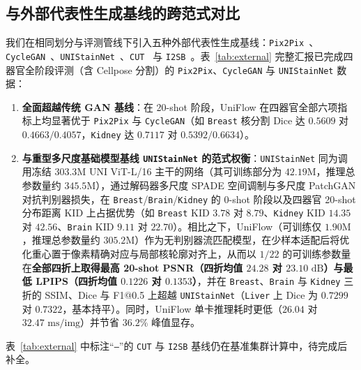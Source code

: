 \documentclass[journal]{IEEEtran}
\newcommand{\methodname}{UniFlow}
\begin{document}
\begin{enumerate}
\end{enumerate}

\subsection{与外部代表性生成基线的跨范式对比}\label{sec:external}
我们在相同划分与评测管线下引入五种外部代表性生成基线：\texttt{Pix2Pix}~\cite{ref_pix2pix}、\texttt{CycleGAN}~\cite{ref_cyclegan}、\texttt{UNIStainNet}~\cite{ref_unistainnet}、\texttt{CUT}~\cite{ref_cut} 与 \texttt{I2SB}~\cite{ref_i2sb}。表~\ref{tab:external} 完整汇报已完成四器官全阶段评测（含 Cellpose 分割）的 \texttt{Pix2Pix}、\texttt{CycleGAN} 与 \texttt{UNIStainNet} 数据：
\begin{enumerate}
    \item \textbf{全面超越传统 GAN 基线}：在 20-shot 阶段，\methodname{} 在四器官全部六项指标上均显著优于 \texttt{Pix2Pix} 与 \texttt{CycleGAN}（如 \texttt{Breast} 核分割 Dice 达 $0.5609$ 对 $0.4663 / 0.4057$，\texttt{Kidney} 达 $0.7117$ 对 $0.5392 / 0.6634$）。
    \item \textbf{与重型多尺度基础模型基线 \texttt{UNIStainNet} 的范式权衡}：\texttt{UNIStainNet} 同为调用冻结 $303.3\text{M}$ UNI ViT-L/16 主干的网络（其可训练部分为 $42.19\text{M}$，推理总参数量约 $345.5\text{M}$），通过解码器多尺度 SPADE 空间调制与多尺度 PatchGAN 对抗判别器损失，在 \texttt{Breast}/\texttt{Brain}/\texttt{Kidney} 的 0-shot 阶段以及四器官 20-shot 分布距离 KID 上占据优势（如 \texttt{Breast} KID $3.78$ 对 $8.79$、\texttt{Kidney} KID $14.35$ 对 $42.56$、\texttt{Brain} KID $9.11$ 对 $22.70$）。相比之下，\methodname{}（可训练仅 $1.90\text{M}$，推理总参数量约 $305.2\text{M}$）作为无判别器流匹配模型，在少样本适配后将优化重心置于像素精确对应与局部核轮廓对齐上，从而以 $1/22$ 的可训练参数量在\textbf{全部四折上取得最高 20-shot PSNR（四折均值 $24.28$ 对 $23.10\text{ dB}$）与最低 LPIPS（四折均值 $0.1226$ 对 $0.1353$）}，并在 \texttt{Breast}、\texttt{Brain} 与 \texttt{Kidney} 三折的 SSIM、Dice 与 F1@0.5 上超越 \texttt{UNIStainNet}（\texttt{Liver} 上 Dice 为 $0.7299$ 对 $0.7322$，基本持平）。同时，\methodname{} 单卡推理耗时更低（$26.04$ 对 $32.47\text{ ms/img}$）并节省 $36.2\%$ 峰值显存。
\end{enumerate}
表~\ref{tab:external} 中标注“\texttt{--}”的 \texttt{CUT} 与 \texttt{I2SB} 基线仍在基准集群计算中，待完成后补全。
\end{document}
